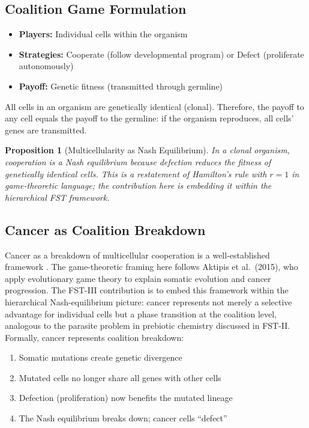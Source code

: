 \documentclass[12pt,a4paper]{article}
\newtheorem{proposition}{Proposition}
\theoremstyle{remark}
\begin{document}
\subsection{Coalition Game Formulation}

\begin{itemize}
    \item \textbf{Players:} Individual cells within the organism
    \item \textbf{Strategies:} Cooperate (follow developmental program) or Defect (proliferate autonomously)
    \item \textbf{Payoff:} Genetic fitness (transmitted through germline)
\end{itemize}

All cells in an organism are genetically identical (clonal). Therefore, the payoff to any cell equals the payoff to the germline: if the organism reproduces, all cells' genes are transmitted.

\begin{proposition}[Multicellularity as Nash Equilibrium]
\label{prop:multicellularity}
In a clonal organism, cooperation is a Nash equilibrium because defection reduces the fitness of genetically identical cells. This is a restatement of Hamilton's rule \citep{Hamilton1964} with $r=1$ in game-theoretic language; the contribution here is embedding it within the hierarchical FST framework.
\end{proposition}

\subsection{Cancer as Coalition Breakdown}

Cancer as a breakdown of multicellular cooperation is a well-established framework \citep{AktipisCancer}. The game-theoretic framing here follows Aktipis et al.\ (2015), who apply evolutionary game theory to explain somatic evolution and cancer progression. The FST-III contribution is to embed this framework within the hierarchical Nash-equilibrium picture: cancer represents not merely a selective advantage for individual cells but a phase transition at the coalition level, analogous to the parasite problem in prebiotic chemistry discussed in FST-II. Formally, cancer represents coalition breakdown:
\begin{enumerate}
    \item Somatic mutations create genetic divergence
    \item Mutated cells no longer share all genes with other cells
    \item Defection (proliferation) now benefits the mutated lineage
    \item The Nash equilibrium breaks down; cancer cells ``defect''
\end{enumerate}
\end{document}
